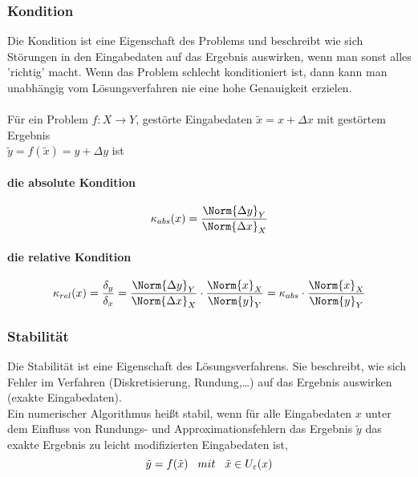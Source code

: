 			\subsubsection{Kondition}
				Die Kondition ist eine Eigenschaft des Problems und beschreibt wie sich Störungen in den Eingabedaten auf das Ergebnis auswirken, wenn man sonst alles 'richtig' macht. Wenn das Problem schlecht konditioniert ist, dann kann man unabhängig vom Lösungsverfahren nie eine hohe Genauigkeit erzielen.\\\\
				Für ein Problem $ f: X \longrightarrow Y $, gestörte Eingabedaten $ \tilde{x} = x + \Delta x $
				mit gestörtem Ergebnis \\$ \tilde{y} = f(\tilde{x}) = y + \Delta y$ ist
				
				\paragraph{die absolute Kondition}
					$$ \kappa_{abs}(x) = \frac{\Norm{\Delta y}_Y}{\Norm{\Delta x}_X} $$
					
				\paragraph{die relative Kondition}
					$$ \kappa_{rel}(x) = \frac{\delta_y}{\delta_x} = \frac{\Norm{\Delta y}_Y}{\Norm{\Delta x}_X} \cdot \frac{\Norm{x}_X}{\Norm{y}_Y} = \kappa_{abs} \cdot \frac{\Norm{x}_X}{\Norm{y}_Y}$$\pagebreak
			
			\subsubsection{Stabilität}
				Die Stabilität ist eine Eigenschaft des Lösungsverfahrens. Sie beschreibt, wie sich Fehler im Verfahren (Diskretisierung, Rundung,\ldots) auf das Ergebnis auswirken (exakte Eingabedaten).\\
				Ein numerischer Algorithmus heißt stabil, wenn für alle Eingabedaten $ x $ unter dem Einfluss von Rundungs- und Approximationsfehlern das Ergebnis $ \tilde{y} $ das exakte Ergebnis zu leicht modifizierten Eingabedaten ist,
					$$ \tilde{y} = f(\tilde{x}) \hspace*{3mm} mit \hspace*{3mm} \tilde{x} \in U_\varepsilon(x)$$

				
				
				
				
				
				
				
					
				
				
				
				
				
					
				
		
		
		
		
		
		
		
		
